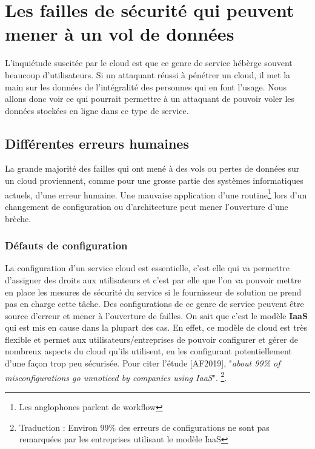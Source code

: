 \documentclass[a4paper, 12pt]{article}
\begin{document}
  \section{Les failles de sécurité qui peuvent mener à un vol de données}
    L'inquiétude suscitée par le cloud est que ce genre de service hébèrge
    souvent beaucoup d'utilisateurs. Si un attaquant réussi à pénétrer un cloud,
    il met la main sur les données de l'intégralité des personnes qui en font
    l'usage. Nous allons donc voir ce qui pourrait permettre à un attaquant de
    pouvoir voler les données stockées en ligne dans ce type de service.

    \subsection{Différentes erreurs humaines}
      La grande majorité des failles qui ont mené à des vols ou pertes de
      données sur un cloud proviennent, comme pour une grosse partie des
      systèmes informatiques actuels, d'une erreur humaine. Une mauvaise
      application d'une routine\footnote{Les anglophones parlent de workflow}
      lors d'un changement de configuration ou d'architecture peut mener
      l'ouverture d'une brèche.

      \subsubsection{Défauts de configuration}
        La configuration d'un service cloud est essentielle, c'est elle qui va
        permettre d'assigner des droits aux utilisateurs et c'est par elle que
        l'on va pouvoir mettre en place les mesures de sécurité du service si le
        fournisseur de solution ne prend pas en charge cette tâche. Des
        configurations de ce genre de service peuvent être source d'erreur et
        mener à l'ouverture de failles. On sait que c'est le modèle
        \textbf{IaaS} qui est mis en cause dans la plupart des cas. En effet, ce
        modèle de cloud est très flexible et permet aux utilisateurs/entreprises
        de pouvoir configurer et gérer de nombreux aspects du cloud qu'ils
        utilisent, en les configurant potentiellement d'une façon trop peu
        sécurisée. Pour citer l'étude [AF2019], "\textit{about 99\% of
        misconfigurations go unnoticed by companies using IaaS}".
        \footnote{Traduction : Environ 99\% des erreurs de configurations ne
        sont pas remarquées par les entreprises utilisant le modèle IaaS}.
\end{document}
